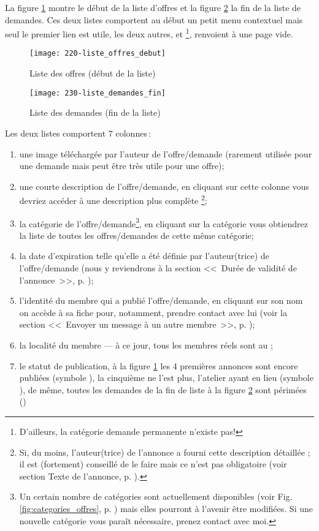 La figure \ref{fig:offresDebut} montre le début de la liste d’offres et la figure \ref{fig:demandesFin} la fin de la liste de demandes. Ces deux listes comportent au début un petit menu contextuel mais seul le premier lien  est utile, les deux autres,  et %
\footnote{D'ailleurs, la catégorie demande permanente n'existe pas!},
renvoient à une page vide.
\begin{figure}
    \texttt{[image: 220-liste\_offres\_debut]}
    \caption[Liste des offres]{Liste des offres (début de la liste)}
    \label{fig:offresDebut}
\end{figure}
\begin{figure}
    \texttt{[image: 230-liste\_demandes\_fin]}
    \caption[Liste des demandes]{Liste des demandes (fin de la liste)}
    \label{fig:demandesFin}
\end{figure}

Les deux listes comportent 7 colonnes\,:
\begin{enumerate}
    \item une image téléchargée par l’auteur de l’offre/demande (rarement utilisée pour une demande mais peut être très utile pour une offre);
    \item une courte description de l'offre/demande, en cliquant sur cette colonne vous devriez accéder à une description plus complète%
    \footnote{Si, du moins, l'auteur(trice) de l'annonce a fourni cette description détaillée ; il est (fortement) conseillé de le faire mais ce n'est pas obligatoire (voir section \og{}Texte de l'annonce\fg, p. \pageref{sec:texteAnnonce}).};
    \item la catégorie de l'offre/demande\footnote{Un certain nombre de catégories sont actuellement disponibles (voir Fig. \ref{fig:categories_offres}, p. \pageref{fig:categories_offres}) mais elles pourront à l’avenir être modifiées. Si une nouvelle catégorie vous paraît nécessaire, prenez contact avec moi.}, en cliquant sur la catégorie vous obtiendrez la liste de toutes les offres/demandes de cette même catégorie;
    \item la date d’expiration telle qu’elle a été définie par l’auteur(trice) de l’offre/demande (nous y reviendrons à la section <<~Durée de validité de l’annonce~>>, p. \pageref{sec:dureeValiditeAnnonce});
    \item l’identité du membre qui a publié l’offre/demande, en cliquant sur son nom on accède à sa fiche pour, notamment, prendre contact avec lui (voir la section <<~Envoyer un message à un autre membre~>>, p. \pageref{page:envoyerCourrielMembre});
    \item la localité du membre --- à ce jour, tous les membres réels sont au \CdS;
    \item le statut de publication, à la figure \ref{fig:offresDebut} les 4 premières annonces sont encore publiées (symbole ), la cinquième ne l’est plus, l’atelier ayant eu lieu (symbole ), de même, toutes les demandes de la fin de liste à la figure \ref{fig:demandesFin} sont périmées ()
\end{enumerate}

